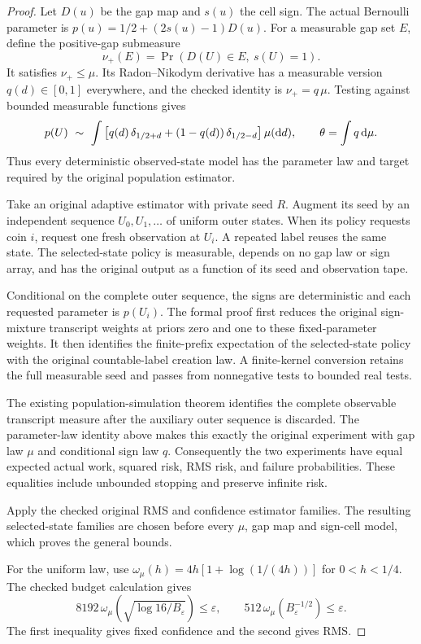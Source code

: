 \begin{proof}
Let $D(u)$ be the gap map and $s(u)$ the cell sign. The actual
Bernoulli parameter is
$p(u)=1/2+(2s(u)-1)D(u)$.
For a measurable gap set $E$, define the positive-gap submeasure
\[
 \nu_+(E)=\Pr(D(U)\in E,\ s(U)=1).
\]
It satisfies $\nu_+\le\mu$.
Its Radon--Nikodym derivative has a measurable version
$q(d)\in[0,1]$ everywhere, and the checked identity is
$\nu_+=q\,\mu$.
Testing against bounded measurable functions gives
\[
 p(U)\ \sim\
 \int\left[q(d)\,\delta_{1/2+d}
       +(1-q(d))\,\delta_{1/2-d}\right]\mu({\rm d}d),
 \qquad
 \theta=\int q\,{\rm d}\mu.
\]
Thus every deterministic observed-state model has the parameter law
and target required by the original population estimator.

Take an original adaptive estimator with private seed $R$.
Augment its seed by an independent sequence
$U_0,U_1,\ldots$ of uniform outer states.
When its policy requests coin $i$, request one fresh observation at
$U_i$. A repeated label reuses the same state. The selected-state
policy is measurable, depends on no gap law or sign array, and has
the original output as a function of its seed and observation tape.

Conditional on the complete outer sequence, the signs are
deterministic and each requested parameter is $p(U_i)$.
The formal proof first reduces the original sign-mixture transcript
weights at priors zero and one to these fixed-parameter weights.
It then identifies the finite-prefix expectation of the
selected-state policy with the original countable-label creation law.
A finite-kernel conversion retains the full measurable seed and
passes from nonnegative tests to bounded real tests.

The existing population-simulation theorem identifies the complete
observable transcript measure after the auxiliary outer sequence is
discarded. The parameter-law identity above makes this exactly the
original experiment with gap law $\mu$ and conditional sign law $q$.
Consequently the two experiments have equal expected actual work,
squared risk, RMS risk, and failure probabilities. These equalities
include unbounded stopping and preserve infinite risk.

Apply the checked original RMS and confidence estimator families.
The resulting selected-state families are chosen before every
$\mu$, gap map and sign-cell model, which proves the general bounds.

For the uniform law, use
$\omega_\mu(h)=4h[1+\log(1/(4h))]$ for $0<h<1/4$.
The checked budget calculation gives
\[
 8192\,\omega_\mu\!\left(\sqrt{\log16/B_\varepsilon}\right)
 \le\varepsilon,\qquad
 512\,\omega_\mu(B_\varepsilon^{-1/2})\le\varepsilon.
\]
The first inequality gives fixed confidence and the second gives RMS.
\end{proof}

